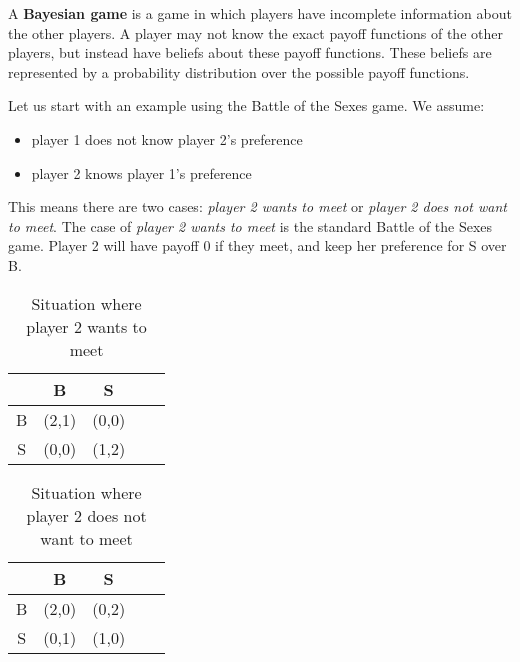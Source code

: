 \begin{definition}
      A \textbf{Bayesian game} is a game in which players have incomplete information about the other players. 
      A player may not know the exact payoff functions of the other players, but instead have beliefs about these payoff functions. 
      These beliefs are represented by a probability distribution over the possible payoff functions.
\end{definition}


\begin{example}
      Let us start with an example using the Battle of the Sexes game. We assume:
      \begin{itemize}
            \item player 1 does not know player 2's preference
            \item player 2 knows player 1's preference
      \end{itemize}
      This means there are two cases: \textit{player 2 wants to meet} or \textit{player 2 does not want to meet}. The case of \textit{player 2 wants to meet} is the standard Battle of the Sexes game. Player 2 will have payoff 0 if they meet, and keep her preference for S over B.

      \begin{table}[h!]
            \begin{center}
                  \begin{tabular}{ c | c c c c}
                          & B     & S     & \\ \hline
                        B & (2,1) & (0,0)   \\
                        S & (0,0) & (1,2)
                  \end{tabular}
                  \vspace{-5pt}
                  \caption{Situation where player 2 wants to meet}
                  \vspace{-25pt}
            \end{center}
      \end{table}

      \begin{table}[h!]
            \begin{center}
                  \begin{tabular}{ c | c c c c}
                          & B     & S     & \\ \hline
                        B & (2,0) & (0,2)   \\
                        S & (0,1) & (1,0)
                  \end{tabular}
                  \vspace{-5pt}
                  \caption{Situation where player 2 does not want to meet}
                  \vspace{-25pt}
            \end{center}
      \end{table}
\end{example}


